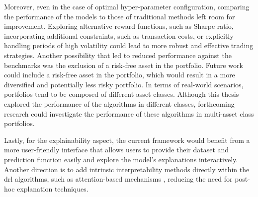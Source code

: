 Moreover, even in the case of optimal hyper-parameter configuration, comparing the performance of the models to those of traditional methods left room for improvement. Exploring alternative reward functions, such as Sharpe ratio, incorporating additional constraints, such as transaction costs, or explicitly handling periods of high volatility could lead to more robust and effective trading strategies. Another possibility that led to reduced performance against the benchmarks was the exclusion of a risk-free asset in the portfolio. Future work could include a risk-free asset in the portfolio, which would result in a more diversified and potentially less risky portfolio. In terms of real-world scenarios, portfolios tend to be composed of different asset classes. Although this thesis explored the performance of the algorithms in different classes, forthcoming research could investigate the performance of these algorithms in multi-asset class portfolios.

Lastly, for the explainability aspect, the current framework would benefit from a more user-friendly interface that allows users to provide their dataset and prediction function easily and explore the model's explanations interactively. Another direction is to add intrinsic interpretability methods directly within the \acrshort{drl} algorithms, such as attention-based mechanisms \cite{Cortes2024}, reducing the need for post-hoc explanation techniques.